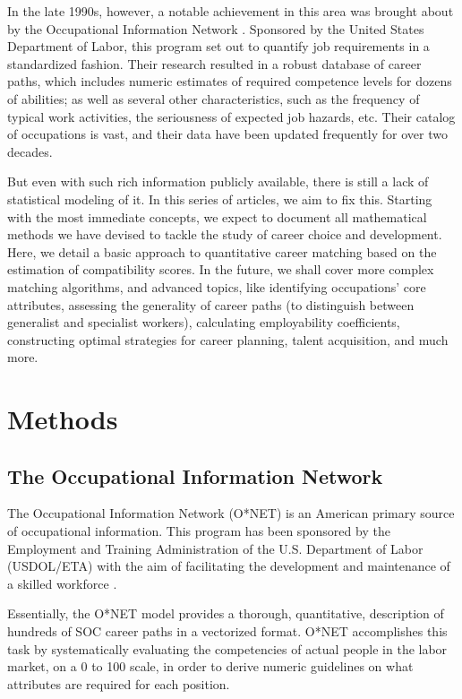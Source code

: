 \documentclass{article}
\begin{document}
In the late 1990s, however, a notable achievement in this area was brought
about by the Occupational Information Network \parencite{onet1998data}. Sponsored by the United States Department of Labor, this
program set out to quantify job requirements in a standardized fashion. Their
research resulted in a robust database of career paths, which includes numeric
estimates of required competence levels for dozens of abilities; as well as
several other characteristics, such as the frequency of typical work
activities, the seriousness of expected job hazards, etc. Their catalog of
occupations is vast, and their data have been updated frequently for over two
decades.

But even with such rich information publicly available, there is still a lack
of statistical modeling of it. In this series of articles, we aim to fix this.
Starting with the most immediate concepts, we expect to document all
mathematical methods we have devised to tackle the study of career choice and
development. Here, we detail a basic approach to quantitative career matching
based on the estimation of compatibility scores. In the future, we shall cover
more complex matching algorithms, and advanced topics, like identifying
occupations' core attributes, assessing the generality of career paths (to
distinguish between generalist and specialist workers), calculating
employability coefficients, constructing optimal strategies for career
planning, talent acquisition, and much more.

\section{Methods}
\subsection{The Occupational Information Network}
The Occupational Information Network (O*NET) is an American primary source of
occupational information. This program has been sponsored by the Employment and
Training Administration of the U.S. Department of Labor (USDOL/ETA) with the
aim of facilitating the development and maintenance of a skilled workforce \parencite{onet2024about}.

Essentially, the O*NET model provides a thorough, quantitative, description of
hundreds of SOC \parencite[Standard Occupational Classification, see][]{bls2018soc} career paths in
a vectorized format. O*NET accomplishes this task by systematically evaluating
the competencies of actual people in the labor market, on a 0 to 100 scale, in
order to derive numeric guidelines on what attributes are required for each
position.
\end{document}
